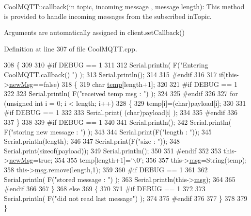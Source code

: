 Cool\+M\+Q\+T\+T\+::callback(in topic, incoming message , message length)\+: This method is provided to handle incoming messages from the subscribed in\+Topic.

Arguments are automatically assigned in client.\+set\+Callback() 

Definition at line 307 of file Cool\+M\+Q\+T\+T.\+cpp.


\begin{DoxyCode}
308 \{
309 
310 \textcolor{preprocessor}{#if DEBUG == 1}
311 
312     Serial.println( F(\textcolor{stringliteral}{"Entering CoolMQTT.callback() "}) );
313     Serial.println();
314 
315 \textcolor{preprocessor}{#endif }
316 
317     \textcolor{keywordflow}{if}(this->\hyperlink{class_cool_m_q_t_t_a3240388137b885775aadf38e96b24c6b}{newMsg}==\textcolor{keyword}{false})
318     \{
319         \textcolor{keywordtype}{char} \hyperlink{_irene3000_8h_a5905d48604152cf57aa6bfa087b49173}{temp}[length+1];
320 
321 \textcolor{preprocessor}{    #if DEBUG == 1}
322 
323         Serial.println( F(\textcolor{stringliteral}{"received temp msg : "}) );
324         
325 \textcolor{preprocessor}{    #endif}
326         
327         \textcolor{keywordflow}{for} (\textcolor{keywordtype}{unsigned} \textcolor{keywordtype}{int} i = 0; i < length; i++) 
328         \{
329             temp[i]=(char)payload[i];
330         
331 \textcolor{preprocessor}{        #if DEBUG == 1 }
332 
333             Serial.print( (\textcolor{keywordtype}{char})payload[i] );
334         
335 \textcolor{preprocessor}{        #endif}
336 
337         \}
338     
339 \textcolor{preprocessor}{    #if DEBUG == 1 }
340 
341         Serial.println();
342         Serial.println( F(\textcolor{stringliteral}{"storing new message : "}) );
343 
344         Serial.print(F(\textcolor{stringliteral}{"length : "}));
345         Serial.println(length);
346         
347         Serial.print(F(\textcolor{stringliteral}{"size : "}));
348         Serial.print(\textcolor{keyword}{sizeof}(payload));
349         Serial.println();
350     
351 \textcolor{preprocessor}{    #endif}
352 
353         this->\hyperlink{class_cool_m_q_t_t_a3240388137b885775aadf38e96b24c6b}{newMsg}=\textcolor{keyword}{true};
354 
355         temp[length+1]=\textcolor{charliteral}{'\(\backslash\)0'};
356 
357         this->\hyperlink{class_cool_m_q_t_t_af6b19e7074dbbb4ae493c44dcb53f7ff}{msg}=String(temp);
358         this->\hyperlink{class_cool_m_q_t_t_af6b19e7074dbbb4ae493c44dcb53f7ff}{msg}.remove(length,1);
359     
360 \textcolor{preprocessor}{    #if DEBUG == 1 }
361 
362         Serial.println( F(\textcolor{stringliteral}{"stored message : "}) );
363         Serial.println(this->\hyperlink{class_cool_m_q_t_t_af6b19e7074dbbb4ae493c44dcb53f7ff}{msg});
364     
365 \textcolor{preprocessor}{    #endif}
366 
367     \}
368     \textcolor{keywordflow}{else}
369     \{
370     
371 \textcolor{preprocessor}{    #if DEBUG == 1}
372 
373         Serial.println( F(\textcolor{stringliteral}{"did not read last message"}) );
374     
375 \textcolor{preprocessor}{    #endif }
376         
377     \}
378 
379 \}
\end{DoxyCode}
